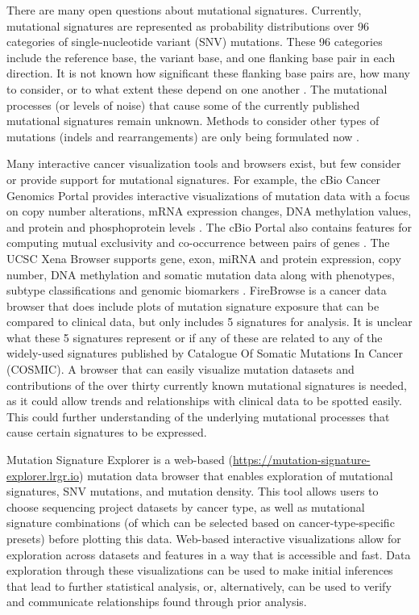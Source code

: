\documentclass[12pt, letterpaper]{article}
\begin{document}
There are many open questions about mutational signatures. 
Currently, mutational signatures are represented as probability distributions over 96 categories of single-nucleotide variant (SNV) mutations.
These 96 categories include the reference base, the variant base, and one flanking base pair in each direction. 
It is not known how significant these flanking base pairs are, how many to consider, or to what extent these depend on one another \cite{shiraishi2015simple}.
The mutational processes (or levels of noise) that cause some of the currently published mutational signatures remain unknown.
Methods to consider other types of mutations (indels and rearrangements) are only being formulated now \cite{zou2018validating}.


Many interactive cancer visualization tools and browsers exist, but few consider or provide support for mutational signatures. 
For example, the cBio Cancer Genomics Portal provides interactive visualizations of mutation data with a focus on copy number alterations, mRNA expression changes, DNA methylation values, and protein and phosphoprotein levels \cite{cerami2012cbio,gao2013integrative}.
The cBio Portal also contains features for computing mutual exclusivity and co-occurrence between pairs of genes \cite{cerami2012cbio,gao2013integrative}.
The UCSC Xena Browser supports gene, exon, miRNA and protein expression, copy number, DNA methylation and somatic mutation data along with phenotypes, subtype classifications and genomic biomarkers \cite{goldman2014ucsc,goldman2016ucsc}.
FireBrowse is a cancer data browser that does include plots of mutation signature exposure that can be compared to clinical data, but only includes 5 signatures for analysis.
It is unclear what these 5 signatures represent or if any of these are related to any of the widely-used signatures published by Catalogue Of Somatic Mutations In Cancer (COSMIC).
A browser that can easily visualize mutation datasets and contributions of the over thirty currently known mutational signatures is needed, as it could allow trends and relationships with clinical data to be spotted easily.
This could further understanding of the underlying mutational processes that cause certain signatures to be expressed.

Mutation Signature Explorer is a web-based (\url{https://mutation-signature-explorer.lrgr.io}) mutation data browser that enables exploration of mutational signatures, SNV mutations, and mutation density.
This tool allows users to choose sequencing project datasets by cancer type, as well as mutational signature combinations (of which can be selected based on cancer-type-specific presets) before plotting this data. 
Web-based interactive visualizations allow for exploration across datasets and features in a way that is accessible and fast.
Data exploration through these visualizations can be used to make initial inferences that lead to further statistical analysis, or, alternatively, can be used to verify and communicate relationships found through prior analysis.
\end{document}
